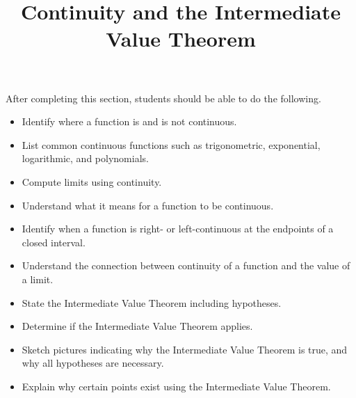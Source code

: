 \documentclass{ximera}
\title{Continuity and the Intermediate Value Theorem}
\begin{document}
\begin{abstract}
\end{abstract}

\maketitle

\begin{sectionOutcomes}
After completing this section, students should be able to do the following.

\begin{itemize}
	\item Identify where a function is and is not continuous.
	\item List common continuous functions such as trigonometric, exponential, logarithmic, and polynomials.
	\item Compute limits using continuity.
	\item Understand what it means for a function to be continuous.
	\item Identify when a function is right- or left-continuous at the endpoints of a closed interval.
	\item Understand the connection between continuity of a function and the value of a limit.
	\item State the Intermediate Value Theorem including hypotheses.
	\item Determine if the Intermediate Value Theorem applies.
	\item Sketch pictures indicating why the Intermediate Value Theorem is true, and why all hypotheses are necessary.
        \item  Explain why certain points exist using the Intermediate Value Theorem.
\end{itemize}

\end{sectionOutcomes}
\end{document}

